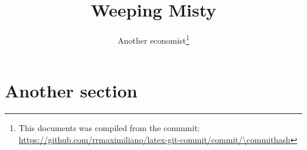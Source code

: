 \documentclass{article}
\newcommand{\reponame}{rrmaximiliano/latex-git-commit}                          %
\newcommand{\commiturl}{\url{https://github.com/\reponame/commit/\commithash}}  %
\begin{document}
\title{Weeping Misty}                                                           %
\author{Another economist\thanks{This documents was compiled from the commmit: \commiturl}}
\maketitle
\begin{abstract}
    \lipsum[1]
\end{abstract}
\section{Another section}
\lipsum[8]


\end{document}
